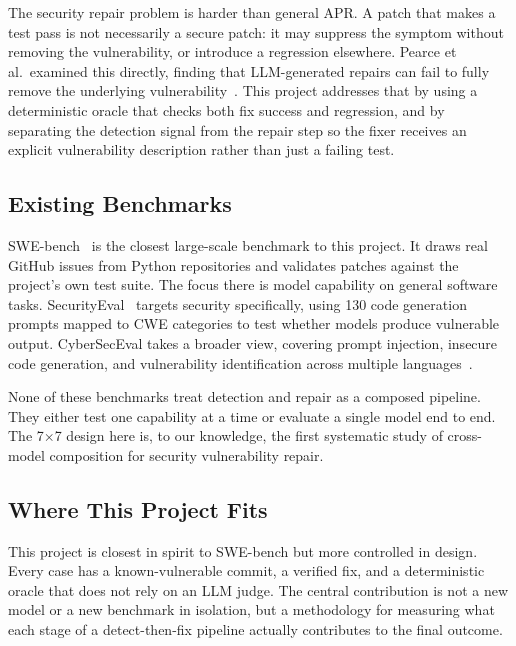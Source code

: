 \documentclass[12pt]{article}
\begin{document}
The security repair problem is harder than general APR. A patch that makes a
test pass is not necessarily a secure patch: it may suppress the symptom
without removing the vulnerability, or introduce a regression elsewhere.
Pearce et al.\ examined this directly, finding that LLM-generated repairs can
fail to fully remove the underlying vulnerability~\cite{pearce2023repair}.
This project addresses that by using a
deterministic oracle that checks both fix success and regression, and by
separating the detection signal from the repair step so the fixer receives
an explicit vulnerability description rather than just a failing test.

\subsection{Existing Benchmarks}

SWE-bench~\cite{swebench} is the closest large-scale benchmark to this
project. It draws real GitHub issues from Python repositories and validates
patches against the project's own test suite. The focus there is model
capability on general software tasks. SecurityEval~\cite{securityeval}
targets security specifically, using 130 code generation prompts mapped to
CWE categories to test whether models produce vulnerable output. CyberSecEval
takes a broader view, covering prompt injection, insecure code generation,
and vulnerability identification across multiple languages~\cite{cyberSecEval}.

None of these benchmarks treat detection and repair as a composed pipeline.
They either test one capability at a time or evaluate a single model end to
end. The 7$\times$7 design here is, to our knowledge, the first systematic
study of cross-model composition for security vulnerability repair.

\subsection{Where This Project Fits}

This project is closest in spirit to SWE-bench but more controlled in design.
Every case has a known-vulnerable commit, a verified fix, and a deterministic
oracle that does not rely on an LLM judge. The central
contribution is not a new model or a new benchmark in isolation, but a
methodology for measuring what each stage of a detect-then-fix pipeline
actually contributes to the final outcome.

\end{document}
